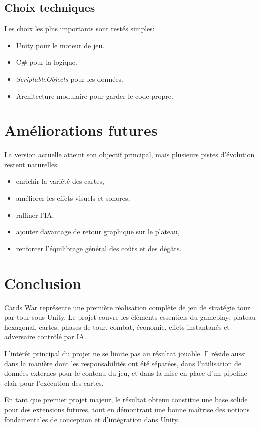\documentclass[12pt,a4paper]{article}
\begin{document}
\subsection{Choix techniques}
Les choix les plus importants sont restés simples:
\begin{itemize}[leftmargin=1.2cm]
    \item Unity pour le moteur de jeu.
    \item C\# pour la logique.
    \item \textit{ScriptableObjects} pour les données.
    \item Architecture modulaire pour garder le code propre.
\end{itemize}

\section{Améliorations futures}
La version actuelle atteint son objectif principal, mais plusieurs pistes d'évolution restent naturelles:
\begin{itemize}[leftmargin=1.2cm]
    \item enrichir la variété des cartes,
    \item améliorer les effets visuels et sonores,
    \item raffiner l'IA,
    \item ajouter davantage de retour graphique sur le plateau,
    \item renforcer l'équilibrage général des coûts et des dégâts.
\end{itemize}

\section{Conclusion}
Cards War représente une première réalisation complète de jeu de stratégie tour par tour sous Unity. Le projet couvre les éléments essentiels du gameplay: plateau hexagonal, cartes, phases de tour, combat, économie, effets instantanés et adversaire contrôlé par IA.

L'intérêt principal du projet ne se limite pas au résultat jouable. Il réside aussi dans la manière dont les responsabilités ont été séparées, dans l'utilisation de données externes pour le contenu du jeu, et dans la mise en place d'un pipeline clair pour l'exécution des cartes.

En tant que premier projet majeur, le résultat obtenu constitue une base solide pour des extensions futures, tout en démontrant une bonne maîtrise des notions fondamentales de conception et d'intégration dans Unity.
\end{document}
